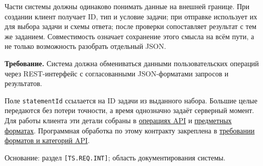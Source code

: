 \documentclass[12pt,a4paper]{article}
\begin{document}
\hypertarget{sr-sys-008-совместимость-обмена}{}

Части системы должны одинаково понимать данные на внешней границе. При создании клиент получает ID, тип и условие задачи; при отправке использует их для выбора задачи и схемы ответа; после проверки сопоставляет результат с тем же заданием. Совместимость означает сохранение этого смысла на всём пути, а не только возможность разобрать отдельный JSON.

\textbf{Требование.} Система должна обмениваться данными пользовательских операций через REST-интерфейс с согласованными JSON-форматами запросов и результатов.

Поле \texttt{statementId} ссылается на ID задачи из выданного набора. Большие целые передаются без потери точности, а время однозначно задаёт серверный момент. Для работы клиента эти детали собраны в \href{../07_\%D0\%9F\%D1\%80\%D0\%BE\%D0\%B3\%D1\%80\%D0\%B0\%D0\%BC\%D0\%BC\%D0\%BD\%D1\%8B\%D0\%B5_\%D1\%82\%D1\%80\%D0\%B5\%D0\%B1\%D0\%BE\%D0\%B2\%D0\%B0\%D0\%BD\%D0\%B8\%D1\%8F/DOC-06.2_\%D0\%A1\%D0\%B5\%D1\%81\%D1\%81\%D0\%B8\%D0\%B8_\%D0\%B7\%D0\%B0\%D0\%B4\%D0\%B0\%D1\%87_\%D0\%B8_\%D0\%BF\%D0\%BB\%D0\%B0\%D0\%BD\%D0\%B8\%D1\%80\%D0\%BE\%D0\%B2\%D1\%89\%D0\%B8\%D0\%BA.pdf\#nameddest=\%D0\%BE\%D0\%BF\%D0\%B5\%D1\%80\%D0\%B0\%D1\%86\%D0\%B8\%D0\%B8}{операциях API} и \href{../07_\%D0\%9F\%D1\%80\%D0\%BE\%D0\%B3\%D1\%80\%D0\%B0\%D0\%BC\%D0\%BC\%D0\%BD\%D1\%8B\%D0\%B5_\%D1\%82\%D1\%80\%D0\%B5\%D0\%B1\%D0\%BE\%D0\%B2\%D0\%B0\%D0\%BD\%D0\%B8\%D1\%8F/DOC-06.2_\%D0\%A1\%D0\%B5\%D1\%81\%D1\%81\%D0\%B8\%D0\%B8_\%D0\%B7\%D0\%B0\%D0\%B4\%D0\%B0\%D1\%87_\%D0\%B8_\%D0\%BF\%D0\%BB\%D0\%B0\%D0\%BD\%D0\%B8\%D1\%80\%D0\%BE\%D0\%B2\%D1\%89\%D0\%B8\%D0\%BA.pdf\#nameddest=\%D0\%BF\%D1\%80\%D0\%B5\%D0\%B4\%D0\%BC\%D0\%B5\%D1\%82\%D0\%BD\%D1\%8B\%D0\%B9-\%D0\%BE\%D1\%82\%D0\%B2\%D0\%B5\%D1\%82}{предметных форматах}. Программная обработка по этому контракту закреплена в \href{../07_\%D0\%9F\%D1\%80\%D0\%BE\%D0\%B3\%D1\%80\%D0\%B0\%D0\%BC\%D0\%BC\%D0\%BD\%D1\%8B\%D0\%B5_\%D1\%82\%D1\%80\%D0\%B5\%D0\%B1\%D0\%BE\%D0\%B2\%D0\%B0\%D0\%BD\%D0\%B8\%D1\%8F/DOC-06.2_\%D0\%A1\%D0\%B5\%D1\%81\%D1\%81\%D0\%B8\%D0\%B8_\%D0\%B7\%D0\%B0\%D0\%B4\%D0\%B0\%D1\%87_\%D0\%B8_\%D0\%BF\%D0\%BB\%D0\%B0\%D0\%BD\%D0\%B8\%D1\%80\%D0\%BE\%D0\%B2\%D1\%89\%D0\%B8\%D0\%BA.pdf\#nameddest=swr-ses-022-\%D1\%84\%D0\%BE\%D1\%80\%D0\%BC\%D0\%B0\%D1\%82\%D1\%8B-\%D0\%B8-\%D0\%BA\%D0\%B0\%D1\%82\%D0\%B5\%D0\%B3\%D0\%BE\%D1\%80\%D0\%B8\%D0\%B8-api}{требовании форматов и категорий API}.

Основание: раздел \texttt{{[}TS.REQ.INT{]}}; область документирования системы.
\end{document}
